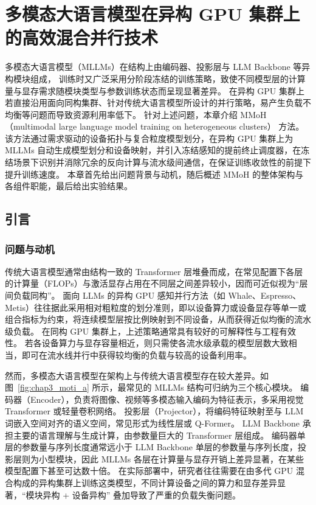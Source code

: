 \chapter{多模态大语言模型在异构 GPU 集群上的高效混合并行技术}

多模态大语言模型（MLLMs）在结构上由编码器、投影层与 LLM Backbone 等异构模块组成，
训练时又广泛采用分阶段冻结的训练策略，致使不同模型层的计算量与显存需求随模块类型与参数训练状态而呈现显著差异。
在异构 GPU 集群上若直接沿用面向同构集群、针对传统大语言模型所设计的并行策略，易产生负载不均衡等问题而导致资源利用率低下。
针对上述问题，本章介绍 MMoH（multimodal large language model training on heterogeneous clusters）
方法。
该方法通过需求驱动的设备拓扑与复合粒度模型划分，在异构 GPU 集群上为 MLLMs 自动生成模型划分和设备映射，并引入冻结感知的提前终止调度器，在冻结场景下识别并消除冗余的反向计算与流水级间通信，在保证训练收敛性的前提下提升训练速度。
本章首先给出问题背景与动机，随后概述 MMoH 的整体架构与各组件职能，最后给出实验结果。

\section{引言}

\subsection{问题与动机}

传统大语言模型通常由结构一致的 Transformer 层堆叠而成，在常见配置下各层的计算量（FLOPs）与激活显存占用在不同层之间差异较小，因而可近似视为“层间负载同构”。
面向 LLMs 的异构 GPU 感知并行方法（如 Whale\cite{whale}、Espresso\cite{espresso2025}、Metis\cite{metis2024}）往往据此采用相对粗粒度的划分准则，即以设备算力或设备显存等单一或组合指标为约束，将连续模型层按比例映射到不同设备，从而获得近似均衡的流水级负载。
在同构 GPU 集群上，上述策略通常具有较好的可解释性与工程有效性。
若各设备算力与显存容量相近，则只需使各流水级承载的模型层数大致相当，即可在流水线并行中获得较均衡的负载与较高的设备利用率。

然而，多模态大语言模型在架构上与传统大语言模型存在较大差异。如图~\ref{fig:chap3_moti_a} 所示，最常见的 MLLMs 结构可归纳为三个核心模块。
编码器（Encoder），负责将图像、视频等多模态输入编码为特征表示，多采用视觉 Transformer 或轻量卷积网络。
投影层（Projector），将编码特征映射至与 LLM 词嵌入空间对齐的语义空间，常见形式为线性层或 Q-Former\cite{blip2}。
LLM Backbone 承担主要的语言理解与生成计算，由参数量巨大的 Transformer 层组成\cite{blip2,llava2023}。
编码器单层的参数量与序列长度通常远小于 LLM Backbone 单层的参数量与序列长度，投影层则为小型模块，因此 MLLMs 各层在计算量与显存开销上差异显著，在某些模型配置下甚至可达数十倍。
在实际部署中，研究者往往需要在由多代 GPU 混合构成的异构集群上训练这类模型，不同计算设备之间的算力和显存差异显著，“模块异构 + 设备异构” 叠加导致了严重的负载失衡问题。

